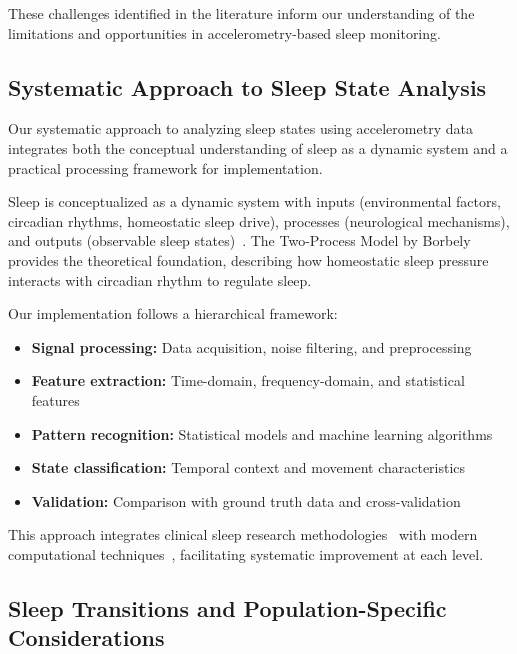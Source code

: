 \documentclass[conference]{IEEEtran}
\begin{document}
These challenges identified in the literature inform our understanding of the limitations and opportunities in accelerometry-based sleep monitoring.

\subsection{Systematic Approach to Sleep State Analysis}

Our systematic approach to analyzing sleep states using accelerometry data integrates both the conceptual understanding of sleep as a dynamic system and a practical processing framework for implementation.

Sleep is conceptualized as a dynamic system with inputs (environmental factors, circadian rhythms, homeostatic sleep drive), processes (neurological mechanisms), and outputs (observable sleep states)~\cite{carskadon2005normal, borbely1982}. The Two-Process Model by Borbely~\cite{borbely1982} provides the theoretical foundation, describing how homeostatic sleep pressure interacts with circadian rhythm to regulate sleep.

Our implementation follows a hierarchical framework:
\begin{itemize}
	\item \textbf{Signal processing:} Data acquisition, noise filtering, and preprocessing~\cite{ancoli2003role, vanHees2015}
	\item \textbf{Feature extraction:} Time-domain, frequency-domain, and statistical features~\cite{sadeh1994activity, kushida2001}
	\item \textbf{Pattern recognition:} Statistical models and machine learning algorithms~\cite{zhang2020machine, behar2013}
	\item \textbf{State classification:} Temporal context and movement characteristics~\cite{rechtschaffen1968, littner2003}
	\item \textbf{Validation:} Comparison with ground truth data and cross-validation~\cite{kushida2001, sadeh2011}
\end{itemize}

This approach integrates clinical sleep research methodologies~\cite{aasm2007, littner2003} with modern computational techniques~\cite{zhang2020machine, behar2013}, facilitating systematic improvement at each level.

\subsection{Sleep Transitions and Population-Specific Considerations}
\end{document}
